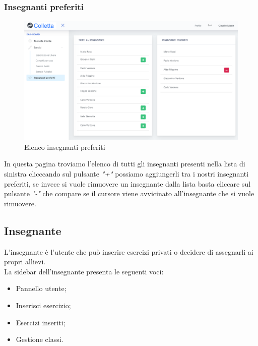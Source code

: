         
        
\subsubsection{Insegnanti preferiti}
        	\begin{figure}[H]
            	\centering
            	\includegraphics[width=17cm]{sez/img/studente/insegnantepreferito.png} 
            	\caption{Elenco insegnanti preferiti}\label{fig:1}
        	\end{figure}        
        In questa pagina troviamo l'elenco di tutti gli insegnanti presenti nella lista di sinistra clicccando sul pulsante \textit{"+"} possiamo aggiungerli tra i nostri insegnanti preferiti, se invece si vuole rimuovere un insegnante dalla lista basta cliccare sul pulsante \textit{"-"} che compare se il cursore viene avvicinato all'insegnante  che si vuole rimuovere.
        
        
        
\newpage
    \subsection{Insegnante}
      L'insegnante è l'utente che può inserire esercizi privati o decidere di assegnarli ai propri allievi. 
         \\La sidebar dell'insegnante presenta le seguenti voci:
        	\begin{itemize}
            	\item Pannello utente;
            	\item Inserisci esercizio;
            	\item Esercizi inseriti;
            	\item Gestione classi.
        	\end{itemize}
        
